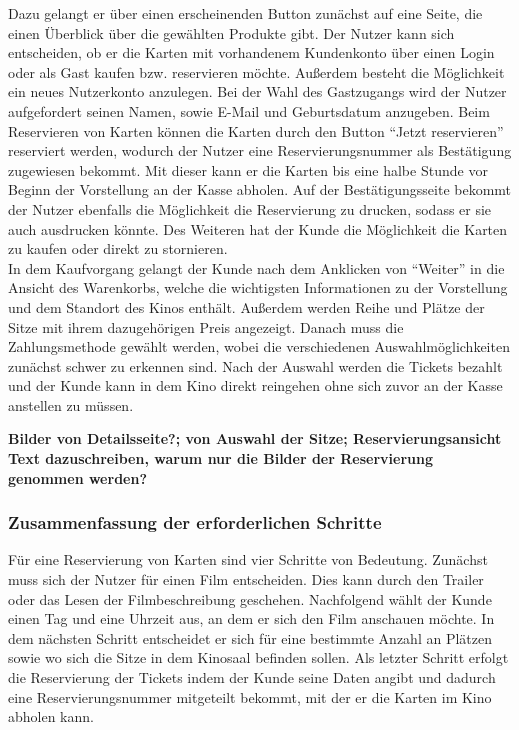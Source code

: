 	Dazu gelangt er über einen erscheinenden Button zunächst auf eine Seite, die einen Überblick über die gewählten Produkte gibt. Der Nutzer kann sich entscheiden, ob er die Karten mit vorhandenem Kundenkonto über einen Login oder als Gast kaufen bzw. reservieren möchte. Außerdem besteht die Möglichkeit ein neues Nutzerkonto anzulegen. Bei der Wahl des Gastzugangs wird der Nutzer aufgefordert seinen Namen, sowie E-Mail und Geburtsdatum anzugeben. 
	Beim Reservieren von Karten können die Karten durch den Button \enquote{Jetzt reservieren} reserviert werden, wodurch der Nutzer eine Reservierungsnummer als Bestätigung zugewiesen bekommt. Mit dieser kann er die Karten bis eine halbe Stunde vor Beginn der Vorstellung an der Kasse abholen. Auf der Bestätigungsseite bekommt der Nutzer ebenfalls die Möglichkeit die Reservierung zu drucken, sodass er sie auch ausdrucken könnte. Des Weiteren hat der Kunde die Möglichkeit die Karten zu kaufen oder direkt zu stornieren. 
	\\In dem Kaufvorgang gelangt der Kunde nach dem Anklicken von \enquote{Weiter} in die Ansicht des Warenkorbs, welche die wichtigsten Informationen zu der Vorstellung und dem Standort des Kinos enthält. Außerdem werden Reihe und Plätze der Sitze mit ihrem dazugehörigen Preis angezeigt. Danach muss die Zahlungsmethode gewählt werden, wobei die verschiedenen Auswahlmöglichkeiten zunächst schwer zu erkennen sind. Nach der Auswahl werden die Tickets bezahlt und der Kunde kann in dem Kino direkt reingehen ohne sich zuvor an der Kasse anstellen zu müssen. 
	
	\begin{center}
		\textbf{Bilder von Detailsseite?; von Auswahl der Sitze; Reservierungsansicht}
	\textbf{\\Text dazuschreiben, warum nur die Bilder der Reservierung genommen werden?}
	\end{center}
	
	\subsubsection{Zusammenfassung der erforderlichen Schritte} 
	Für eine Reservierung von Karten sind vier Schritte von Bedeutung. Zunächst muss sich der Nutzer für einen Film entscheiden. Dies kann durch den Trailer oder das Lesen der Filmbeschreibung geschehen. Nachfolgend wählt der Kunde einen Tag und eine Uhrzeit aus, an dem er sich den Film anschauen möchte. In dem nächsten Schritt entscheidet er sich für eine bestimmte Anzahl an Plätzen sowie wo sich die Sitze in dem Kinosaal befinden sollen. Als letzter Schritt erfolgt die Reservierung der Tickets indem der Kunde seine Daten angibt und dadurch eine Reservierungsnummer mitgeteilt bekommt, mit der er die Karten im Kino abholen kann.
	
